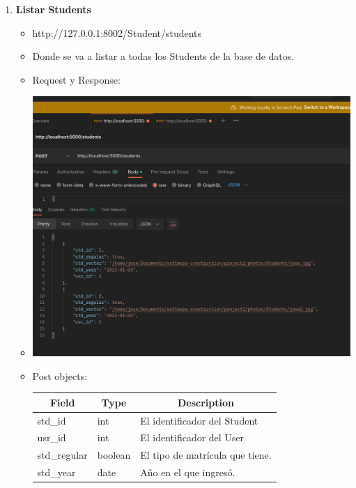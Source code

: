 \documentclass{article}
\begin{document}
\begin{enumerate}
    \item \textbf{Listar Students}
    \begin{itemize}
        \item http://127.0.0.1:8002/Student/students
        \item Donde se va a listar a todas los Students de la base de
        datos.
        \item Request y Response:
        \item \includegraphics[scale=.5]{assets/student/students.png}
        \item Post objects: \begin{table}[H] \centering
        \begin{tabular}{|l|l|l|} \hline \multicolumn{1}{|c|}{\textbf{Field}} &
        \multicolumn{1}{c|}{\textbf{Type}} &
        \multicolumn{1}{c|}{\textbf{Description}} \\ \hline std\_id & int & El
        identificador del Student \\ \hline usr\_id & int & El identificador del
        User \\ \hline std\_regular & boolean & El tipo de matrícula que tiene.
        \\ \hline std\_year & date & Año en el que ingresó. \\ \hline
        \end{tabular} \end{table}
    \end{itemize}


\end{enumerate}
\end{document}
